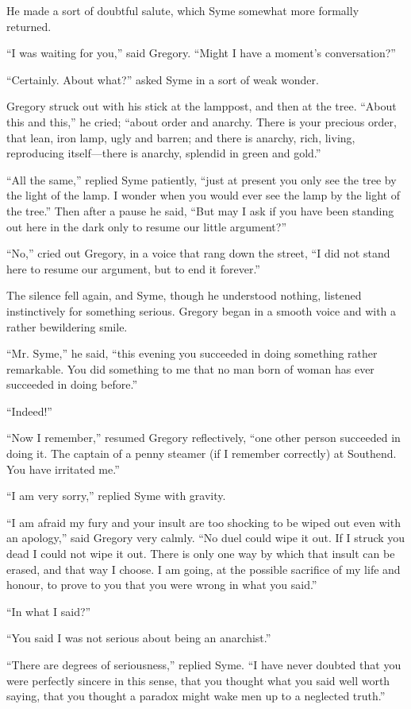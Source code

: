 He made a sort of doubtful salute, which Syme somewhat more formally returned.

“I was waiting for you,” said Gregory. “Might I have a moment’s conversation?”

“Certainly. About what?” asked Syme in a sort of weak wonder.

Gregory struck out with his stick at the lamppost, and then at the tree. “About this and this,” he cried; “about order and anarchy. There is your precious order, that lean, iron lamp, ugly and barren; and there is anarchy, rich, living, reproducing itself⁠—there is anarchy, splendid in green and gold.”

“All the same,” replied Syme patiently, “just at present you only see the tree by the light of the lamp. I wonder when you would ever see the lamp by the light of the tree.” Then after a pause he said, “But may I ask if you have been standing out here in the dark only to resume our little argument?”

“No,” cried out Gregory, in a voice that rang down the street, “I did not stand here to resume our argument, but to end it forever.”

The silence fell again, and Syme, though he understood nothing, listened instinctively for something serious. Gregory began in a smooth voice and with a rather bewildering smile.

“Mr. Syme,” he said, “this evening you succeeded in doing something rather remarkable. You did something to me that no man born of woman has ever succeeded in doing before.”

“Indeed!”

“Now I remember,” resumed Gregory reflectively, “one other person succeeded in doing it. The captain of a penny steamer (if I remember correctly) at Southend. You have irritated me.”

“I am very sorry,” replied Syme with gravity.

“I am afraid my fury and your insult are too shocking to be wiped out even with an apology,” said Gregory very calmly. “No duel could wipe it out. If I struck you dead I could not wipe it out. There is only one way by which that insult can be erased, and that way I choose. I am going, at the possible sacrifice of my life and honour, to prove to you that you were wrong in what you said.”

“In what I said?”

“You said I was not serious about being an anarchist.”

“There are degrees of seriousness,” replied Syme. “I have never doubted that you were perfectly sincere in this sense, that you thought what you said well worth saying, that you thought a paradox might wake men up to a neglected truth.”

